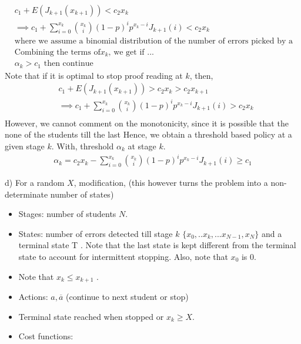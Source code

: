 \documentclass[12pt]{article}
\begin{document}
 \begin{align*}
 & c_1 + E(J _{k+1}(x_{k+1}) )< c_2x_k \\
 & \implies c_1 + \sum_{i=0}^{x_k} \binom{x_k}{i} (1-p)^i p^{x_k-i} J_{k+1}(i)  < c_2 x_k\\
 & \text{where we assume a binomial distribution of the number of errors picked by a student.} \\
 & \text{Combining the terms of} x_k \text{, we get if ...} \\
 & \alpha_k > c_1  \text{ then continue} 
 \end{align*}
 Note that if it is optimal to stop proof reading at $k$, then,
  \begin{align*}
 & c_1 + E(J _{k+1}(x_{k+1}) )>c_2x_k>c_2x_{k+1} \\
 & \implies c_1 + \sum_{i=0}^{x_k} \binom{x_k}{i} (1-p)^i p^{x_k-i} J_{k+1}(i)  > c_2 x_k\\
 \end{align*}
 However, we cannot comment on the monotonicity, since it is possible that the none of the students till the last 
 Hence, we obtain a threshold based policy at a given stage $k$. With, threshold $\alpha_k$ at stage $k$. \\
 
 \begin{align*}
 \alpha_k= c_2x_k - \sum_{i=0}^{x_k} \binom{x_k}{i} (1-p)^i p^{x_k-i} J_{k+1}(i)  \geqslant c_1 
 \end{align*}
 
 d) For a random $X$, modification, (this however turns the problem into a non-determinate number of states)
 
\begin{itemize}
\item  Stages: number of students $N$.
\item States: number of errors detected till stage  $k$ $\{x_0,..x_k,...x_{N-1},x_{N}\}$ and a terminal state T . Note that the last state is kept different from the terminal state to account for intermittent stopping. Also, note that $x_0$ is $0$.
\item Note that $x_k \leqslant x_{k+1}$ .
\item Actions: $a, \overline{a}$ (continue to next student or stop)
\item Terminal state reached when stopped or $x_k \geqslant X$.
\item  Cost functions:
\end{itemize}
\end{document}
